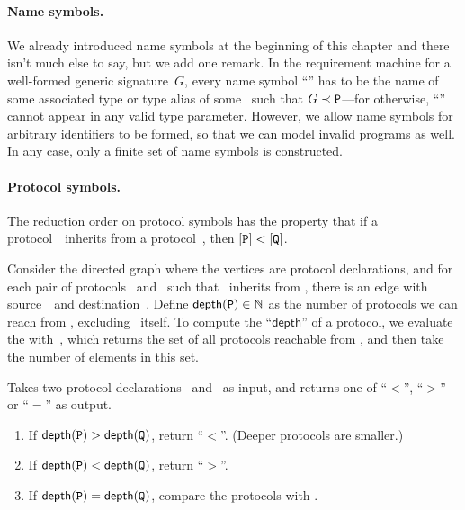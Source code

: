 \documentclass[../generics]{subfiles}
\begin{document}
\paragraph{Name symbols.}
We already introduced name symbols at the beginning of this chapter and there isn't much else to say, but we add one remark. In the requirement machine for a well-formed generic signature~$G$, every name symbol ``\nA'' has to be the name of some associated type or type alias of some \tP\ such that $G\prec\texttt{P}$---for otherwise, ``\nA'' cannot appear in any valid type parameter. However, we allow name symbols for arbitrary identifiers to be formed, so that we can model invalid programs as well. In any case, only a finite set of name symbols is constructed.

\paragraph{Protocol symbols.}
The reduction order on protocol symbols has the property that if a protocol~\tQ\ inherits from a protocol~\tP, then $[\texttt{P}]<[\texttt{Q}]$.

Consider the directed graph where the vertices are protocol declarations, and for each pair of protocols \tQ\ and \tP\ such that \tQ\ inherits from \tP, there is an edge with source~\tQ\ and destination~\tP. Define $\mathsf{depth}(\texttt{P})\in\mathbb{N}$ as the number of protocols we can reach from \tP, excluding \tP\ itself. To compute the ``$\mathsf{depth}$'' of a protocol, we evaluate the  with~\tP, which returns the set of all protocols reachable from \tP, and then take the number of elements in this set.

\begin{algorithm}\label{protocol reduction order} Takes two protocol declarations \tP\ and \tQ\ as input, and returns one of ``$<$'', ``$>$'' or ``$=$'' as output.
\begin{enumerate}
\item If $\mathsf{depth}(\texttt{P})>\mathsf{depth}(\texttt{Q})$, return ``$<$''. (Deeper protocols are smaller.)
\item If $\mathsf{depth}(\texttt{P})<\mathsf{depth}(\texttt{Q})$, return ``$>$''.
\item If $\mathsf{depth}(\texttt{P})=\mathsf{depth}(\texttt{Q})$, compare the protocols with .
\end{enumerate}
\end{algorithm}
\end{document}
